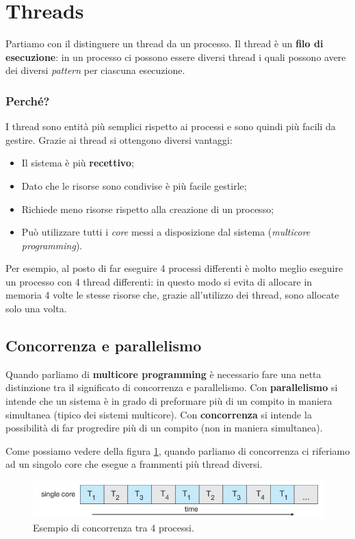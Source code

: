 \section{Threads}
Partiamo con il distinguere un thread da un processo. Il thread è un \textbf{filo di esecuzione}: in un processo ci possono essere diversi thread i quali possono avere dei diversi \textit{pattern} per ciascuna esecuzione.

\subsubsection*{Perché?}
I thread sono entità più semplici rispetto ai processi e sono quindi più facili da gestire. Grazie ai thread si ottengono diversi vantaggi:
\vspace{-5px}
\begin{itemize}
\setlength{\itemsep}{-.25 em}
    \item Il sistema è più \textbf{recettivo};
    \item Dato che le risorse sono condivise è più facile gestirle;
    \item Richiede meno risorse rispetto alla creazione di un processo;
    \item Può utilizzare tutti i \textit{core} messi a disposizione dal sistema (\textit{multicore programming}).
\end{itemize}

\noindent Per esempio, al posto di far eseguire 4 processi differenti è molto meglio eseguire un processo con 4 thread differenti: in questo modo si evita di allocare in memoria 4 volte le stesse risorse che, grazie all'utilizzo dei thread, sono allocate solo una volta. 
% 
\subsection{Concorrenza e parallelismo} \label{parallelismo}
Quando parliamo di \textbf{multicore programming} è necessario fare una netta distinzione tra il significato di concorrenza e parallelismo. Con \textbf{parallelismo} si intende che un sistema è in grado di preformare più di un compito in maniera simultanea (tipico dei sistemi multicore). Con \textbf{concorrenza} si intende la possibilità di far progredire più di un compito (non in maniera simultanea).

Come possiamo vedere della figura \ref{fig:concorrenza}, quando parliamo di concorrenza ci riferiamo ad un singolo core che esegue a frammenti più thread diversi.
\begin{figure}[!h]
    \centering
    \includegraphics[width=.7\textwidth]{../res/imgs/threads/concorrenza.png}
    \caption{Esempio di concorrenza tra 4 processi.}
    \label{fig:concorrenza}
\end{figure}

